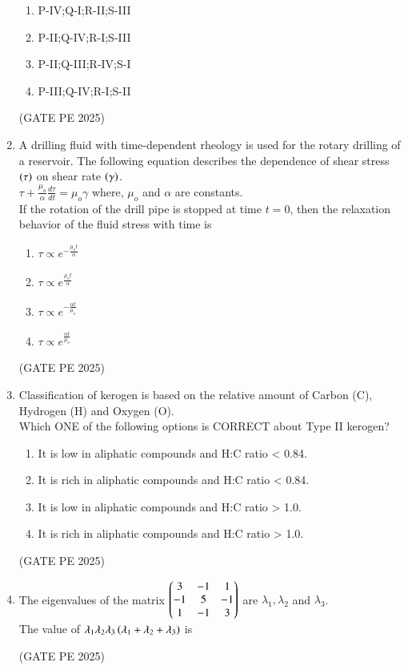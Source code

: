 \documentclass[journal,12pt,onecolumn]{IEEEtran}
\theoremstyle{remark}
\begin{document}
\begin{enumerate}

\begin{enumerate}
    \item P-IV;Q-I;R-II;S-III
    \item P-II;Q-IV;R-I;S-III
    \item P-II;Q-III;R-IV;S-I
    \item P-III;Q-IV;R-I;S-II
\end{enumerate}
\hfill{(GATE PE 2025)}

\item A drilling fluid with time-dependent rheology is used for the rotary drilling of a reservoir. The following equation describes the dependence of shear stress $\left(\tau\right)$ on
shear rate $\left(\gamma\right)$.\\
$\tau+\frac{\mu_o}{\alpha}\frac{d\tau}{dt}=\mu_o\gamma$
where, $\mu_o$ and $\alpha$ are constants.\\
If the rotation of the drill pipe is stopped at time $t=0$, then the relaxation behavior of the fluid stress with time is
\begin{enumerate}
    \item $\tau \propto e^{-\frac{\mu_ot}{\alpha}}$
    \item $\tau \propto e^{\frac{\mu_ot}{\alpha}}$
    \item $\tau \propto e^{-\frac{\alpha t}{\mu_o}}$
    \item $\tau \propto e^{\frac{\alpha t}{\mu_o}}$
\end{enumerate}
\hfill{(GATE PE 2025)}

\item Classification of kerogen is based on the relative amount of Carbon (C), Hydrogen (H) and Oxygen (O).\\
Which ONE of the following options is CORRECT about Type II kerogen?
\begin{enumerate}
    \item It is low in aliphatic compounds and H:C ratio < 0.84.
    \item It is rich in aliphatic compounds and H:C ratio < 0.84.
    \item It is low in aliphatic compounds and H:C ratio > 1.0.
    \item It is rich in aliphatic compounds and H:C ratio > 1.0.
\end{enumerate}
\hfill{(GATE PE 2025)}

\item The eigenvalues of the matrix $\begin{pmatrix}3&-1&1\\
-1&5&-1\\
1&-1&3
\end{pmatrix}$ are $\lambda_1,\lambda_2$ and $\lambda_3$.\\
The value of $\lambda_1\lambda_2\lambda_3\left(\lambda_1+\lambda_2+\lambda_3\right)$ is
\begin{enumerate}
\end{enumerate}
\hfill{(GATE PE 2025)}



\end{enumerate}
\end{document}

